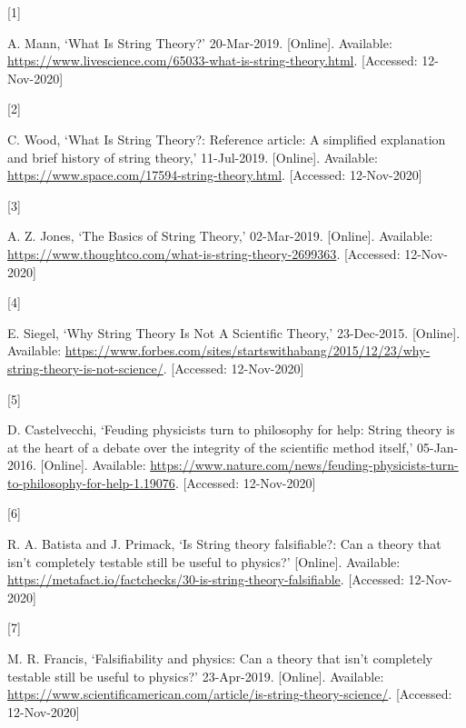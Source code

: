 \documentclass[
  12pt,
  british,
  a4paper,
]{article}
\newlength{\cslhangindent}
\newlength{\csllabelwidth}
\newenvironment{CSLReferences}[2] %
 {%
  \setlength{\parindent}{0pt}
  \ifodd #1 \everypar{\setlength{\hangindent}{\cslhangindent}}\ignorespaces\fi
  \ifnum #2 > 0
  \setlength{\parskip}{#2\baselineskip}
  \fi
 }%
 {}
\newcommand{\CSLLeftMargin}[1]{\parbox[t]{\csllabelwidth}{#1}}
\newcommand{\CSLRightInline}[1]{\parbox[t]{\linewidth - \csllabelwidth}{#1}\break}
\begin{document}
\hypertarget{refs}{}
\begin{CSLReferences}{0}{0}
\leavevmode{}%
\CSLLeftMargin{{[}1{]} }
\CSLRightInline{A. Mann, {`{What Is String Theory?}'} 20-Mar-2019.
{[}Online{]}. Available:
\url{https://www.livescience.com/65033-what-is-string-theory.html}.
{[}Accessed: 12-Nov-2020{]}}

\leavevmode{}%
\CSLLeftMargin{{[}2{]} }
\CSLRightInline{C. Wood, {`{What Is String Theory?}: Reference article:
A simplified explanation and brief history of string theory,'}
11-Jul-2019. {[}Online{]}. Available:
\url{https://www.space.com/17594-string-theory.html}. {[}Accessed:
12-Nov-2020{]}}

\leavevmode{}%
\CSLLeftMargin{{[}3{]} }
\CSLRightInline{A. Z. Jones, {`{The Basics of String Theory},'}
02-Mar-2019. {[}Online{]}. Available:
\url{https://www.thoughtco.com/what-is-string-theory-2699363}.
{[}Accessed: 12-Nov-2020{]}}

\leavevmode{}%
\CSLLeftMargin{{[}4{]} }
\CSLRightInline{E. Siegel, {`{Why String Theory Is Not A Scientific
Theory},'} 23-Dec-2015. {[}Online{]}. Available:
\url{https://www.forbes.com/sites/startswithabang/2015/12/23/why-string-theory-is-not-science/}.
{[}Accessed: 12-Nov-2020{]}}

\leavevmode{}%
\CSLLeftMargin{{[}5{]} }
\CSLRightInline{D. Castelvecchi, {`{Feuding physicists turn to
philosophy for help}: String theory is at the heart of a debate over the
integrity of the scientific method itself,'} 05-Jan-2016. {[}Online{]}.
Available:
\url{https://www.nature.com/news/feuding-physicists-turn-to-philosophy-for-help-1.19076}.
{[}Accessed: 12-Nov-2020{]}}

\leavevmode{}%
\CSLLeftMargin{{[}6{]} }
\CSLRightInline{R. A. Batista and J. Primack, {`{Is String theory
falsifiable?}: Can a theory that isn't completely testable still be
useful to physics?'} {[}Online{]}. Available:
\url{https://metafact.io/factchecks/30-is-string-theory-falsifiable}.
{[}Accessed: 12-Nov-2020{]}}

\leavevmode{}%
\CSLLeftMargin{{[}7{]} }
\CSLRightInline{M. R. Francis, {`{Falsifiability and physics}: Can a
theory that isn't completely testable still be useful to physics?'}
23-Apr-2019. {[}Online{]}. Available:
\url{https://www.scientificamerican.com/article/is-string-theory-science/}.
{[}Accessed: 12-Nov-2020{]}}


\end{CSLReferences}
\end{document}
